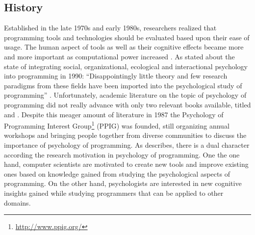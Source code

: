 \subsection{History}
\label{history-of-psychology-of-programming}
Established in the late 1970s and early 1980s, researchers realized that programming tools and technologies should be evaluated based upon their ease of usage.
The human aspect of tools as well as their cognitive effects became more and more important as computational power increased \autocite{sajaniemi_psychology_2008}.
As \citeauthor{curtis_psychology_1990} stated about the state of integrating social, organizational, ecological and interactional psychology into programming in 1990: ``Disappointingly little theory and few research paradigms from these fields have been imported into the psychological study of programming'' \autocite[253]{curtis_psychology_1990}.
Unfortunately, academic literature on the topic of psychology of programming did not really advance with only two relevant books available, titled  \autocite{weinberg_psychology_1971} and  \autocite{hoc_psychology_1990}.
Despite this meager amount of literature in 1987 the Psychology of Programming Interest Group\footnote{\url{http://www.ppig.org/}} (PPIG) was founded, still organizing annual workshops and bringing people together from diverse communities to discuss the importance of psychology of programming.
As \textcite{sajaniemi_psychology_2008} describes, there is a dual character according the research motivation in psychology of programming.
One the one hand, computer scientists are motivated to create new tools and improve existing ones based on knowledge gained from studying the psychological aspects of programming.
On the other hand, psychologists are interested in new cognitive insights gained while studying programmers that can be applied to other domains.

